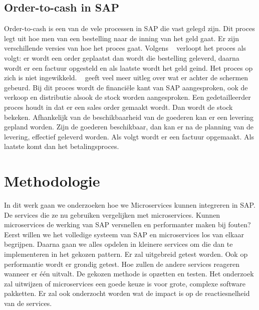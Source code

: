 \subsection{Order-to-cash in SAP}
Order-to-cash is een van de vele processen in SAP die vast gelegd zijn. Dit proces legt uit hoe men van een bestelling naar de inning van het geld gaat. Er zijn verschillende versies van hoe het proces gaat. Volgens ~\cite{Akhtar2018} verloopt het proces als volgt: er wordt een order geplaatst dan wordt die bestelling geleverd, daarna wordt er een factuur opgesteld en als laatste wordt het geld geind. Het proces op zich is niet ingewikkeld. ~\cite{OpenSAPOrderToCash2018} geeft veel meer uitleg over wat er achter de schermen gebeurd. Bij dit proces wordt de financiële kant van SAP aangesproken, ook de verkoop en distributie alsook de stock worden aangesproken. Een gedetailleerder proces houdt in dat er een sales order gemaakt wordt. Dan wordt de stock bekeken. Afhankelijk van de beschikbaarheid van de goederen kan er een levering gepland worden. Zijn de goederen beschikbaar, dan kan er na de planning van de levering, effectief geleverd worden. Als volgt wordt er een factuur opgemaakt. Als laatste komt dan het betalingsproces. 


\section{Methodologie}
\label{sec:methodologie}
In dit werk gaan we onderzoeken hoe we Microservices kunnen integreren in SAP. De services die ze nu gebruiken vergelijken met microservices. Kunnen microservices de werking van SAP versnellen en performanter maken bij fouten?
Eerst willen we het volledige systeem van SAP en microservices los van elkaar begrijpen. Daarna gaan we alles opdelen in kleinere services om die dan te implementeren in het gekozen pattern. Er zal uitgebreid getest worden. Ook op performantie wordt er grondig getest. Hoe zullen de andere services reageren wanneer er één uitvalt. De gekozen methode is opzetten en testen. 
Het onderzoek zal uitwijzen of microservices een goede keuze is voor grote, complexe software pakketten. 
Er zal ook onderzocht worden wat de impact is op de reactiesnelheid van de services.


